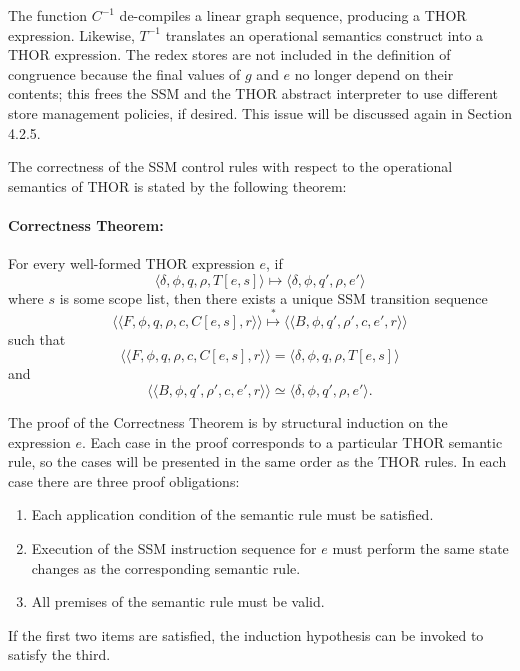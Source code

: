 
The function \(C^{-1}\) de-compiles a linear graph sequence, producing a THOR
expression. Likewise, \(T^{-1}\) translates an operational semantics construct
into a THOR expression. The redex stores are not included in the definition of
congruence because the final values of \(g\) and \(e\) no longer depend on
their contents; this frees the SSM and the THOR abstract interpreter to use
different store management policies, if desired. This issue will be discussed
again in Section 4.2.5.

The correctness of the SSM control rules with respect to the operational
semantics of THOR is stated by the following theorem:

\paragraph{Correctness Theorem:} For every well-formed THOR expression \(e\),
if
\[
\langle \delta,\phi,q,\rho,T[e,s]\rangle
\longmapsto
\langle \delta,\phi,q',\rho,e'\rangle
\]
where \(s\) is some scope list, then there exists a unique SSM transition
sequence
\[
\langle\!\langle F,\phi,q,\rho,c,C[e,s],r\rangle\!\rangle
\overset{*}{\longmapsto}
\langle\!\langle B,\phi,q',\rho',c,e',r\rangle\!\rangle
\]
such that
\[
\langle\!\langle F,\phi,q,\rho,c,C[e,s],r\rangle\!\rangle
= \langle \delta,\phi,q,\rho,T[e,s]\rangle
\]
and
\[
\langle\!\langle B,\phi,q',\rho',c,e',r\rangle\!\rangle
\simeq \langle \delta,\phi,q',\rho,e'\rangle.
\]

The proof of the Correctness Theorem is by structural induction on the
expression \(e\). Each case in the proof corresponds to a particular THOR
semantic rule, so the cases will be presented in the same order as the THOR
rules. In each case there are three proof obligations:

\begin{enumerate}
\item Each application condition of the semantic rule must be satisfied.
\item Execution of the SSM instruction sequence for \(e\) must perform the same
state changes as the corresponding semantic rule.
\item All premises of the semantic rule must be valid.
\end{enumerate}

If the first two items are satisfied, the induction hypothesis can be invoked
to satisfy the third.


